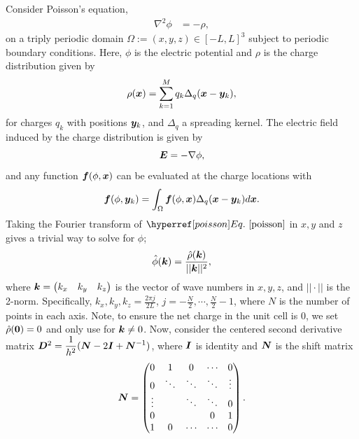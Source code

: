 Consider Poisson's equation,
\begin{align}
\displaystyle \nabla^2 \phi &= -\rho, \label{poisson}
\end{align}
on a triply periodic domain $\Omega := (x,y,z) \in[-L,L]^3$ subject to periodic boundary conditions. Here, $\phi$ is the electric potential and $\rho$ is the charge distribution given by
\begin{equation}
\rho(\boldsymbol x) = \displaystyle \sum_{k=1}^M q_k\Delta_q(\boldsymbol x - \boldsymbol y_k),
\end{equation}
for charges $q_k$ with positions $\boldsymbol y_k$, and $\Delta_q$ a spreading kernel. The electric field induced by the charge distribution is given by
\begin{equation}
\boldsymbol E = -\nabla \phi,
\end{equation}
and any function $\boldsymbol f(\phi,\boldsymbol x)$ can be evaluated at the charge locations with
\begin{equation}\label{interp}
\boldsymbol f(\phi,\boldsymbol y_k) =  \displaystyle \int_{\Omega} \boldsymbol f(\phi,\boldsymbol x)\Delta_q(\boldsymbol x - \boldsymbol y_k) d\boldsymbol x.
\end{equation}
Taking the Fourier transform of $\myref{Eq.}{poisson}$ in $x,y$ and $z$ gives a trivial way to solve for $\phi$;
\begin{equation}\label{specsolve}
\hat{\phi}(\boldsymbol k) = \frac{\hat{\rho}(\boldsymbol k)}{||\boldsymbol k||^2},
\end{equation}
where $\boldsymbol k = \begin{pmatrix} k_x & k_y & k_z\end{pmatrix}$ is the vector of wave numbers in $x,y,z$, and $||\cdot||$ is the 2-norm. Specifically, $k_x,k_y,k_z = \frac{2\pi j}{2L}$, $j = -\frac{N}{2},\cdots, \frac{N}{2}-1$, where $N$ is the number of points in each axis. Note, to ensure the net charge in the unit cell is 0, we set $\hat{\rho}(\boldsymbol 0) =0$ and only use  for $\boldsymbol k \neq 0$.
Now, consider the centered second derivative matrix $\boldsymbol D^2 = \displaystyle \frac{1}{h^2}(\boldsymbol N - 2\boldsymbol I + \boldsymbol N^{-1})$, where $\boldsymbol I$ is identity and $\boldsymbol N$ is the shift matrix
\begin{equation}
\boldsymbol N = \begin{pmatrix} 
0 & 1 & 0 & \cdots & 0 \\
0 & \ddots & \ddots & \ddots & \vdots \\
\vdots & & \ddots & \ddots & 0 \\
0 & & & 0 & 1 \\
1 & 0 & \cdots & \cdots & 0
\end{pmatrix}.
\end{equation}
